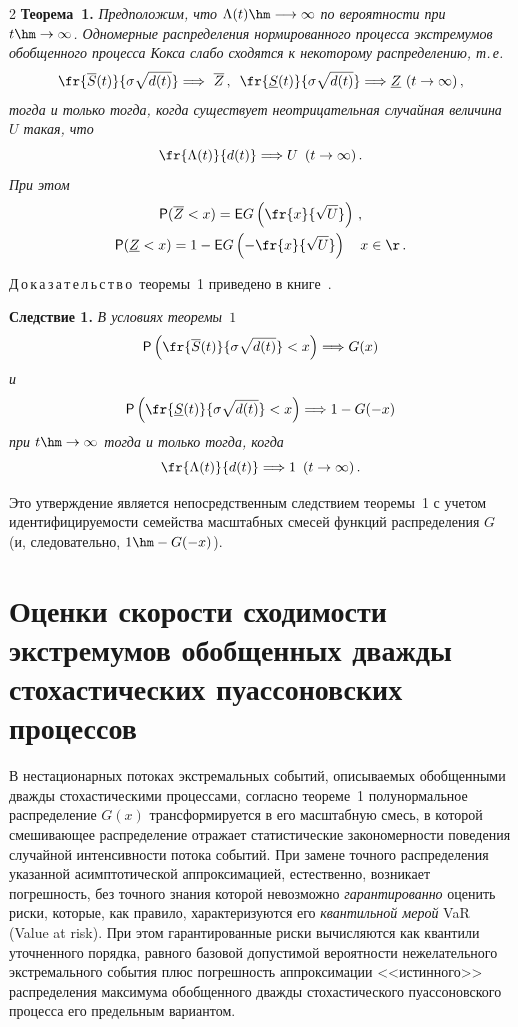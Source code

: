 \begin{multicols}{2}
\noindent
\textbf{Теорема~1.} \textit{Предположим, что $\Lambda
(t)\hm\longrightarrow\infty$ по вероятности при $t\hm\to\infty$.
Одномерные распределения нормированного процесса экстремумов
обобщенного процесса Кокса слабо сходятся к некоторому
распределению, т.\,е.}
$$
\fr{\overline S(t)}{\sigma\sqrt{d(t)}} \Longrightarrow\ 
\overline Z\,,\enskip \fr{\underline S(t)}{\sigma\sqrt{d(t)}}
\Longrightarrow  \underline Z \ (t\to\infty)\,,
$$
\textit{тогда и только тогда, когда существует неотрицательная случайная
величина $U$ такая, что}
\begin{equation}
\fr{\Lambda(t)}{d(t)}\Longrightarrow U\enskip
(t\to\infty)\,.
\label{e2-dul}\end{equation}
\textit{При этом}
\begin{gather*}
{\sf P}(\overline Z<x) = {\sf E}G\left(\fr{x}{\sqrt{U}}\right)\,,\\ 
 {\sf
P}(\underline Z<x) =1-{\sf E}G\left(-\fr{x}{\sqrt{U}}\right)\ \ \ x\in\r\,.
\end{gather*}

\smallskip

\noindent
Д\,о\,к\,а\,з\,а\,т\,е\,л\,ь\,с\,т\,в\,о~теоремы~1 приведено в 
книге~\cite{KorolevSokolov2008}.

\smallskip

\noindent
\textbf{Следствие 1.} \textit{В условиях теоремы~$1$
$$
{\sf P}\left(\fr{\overline S(t)}{\sigma \sqrt{d(t)}} <x\right)
\Longrightarrow G(x)
$$ 
и 
$${\sf P}\left(\fr{\underline
S(t)}{\sigma \sqrt{d(t)}} <x\right) \Longrightarrow 1-G(-x)
$$ при
$t\hm\to\infty$ тогда и только тогда, когда}
$$
\fr{\Lambda(t)}{d(t)} \Longrightarrow   1 \enskip (t\to\infty)\,.
$$

\smallskip

Это утверждение является непосредственным следствием теоремы~1 с
учетом идентифици\-ру\-емости семейства масштабных смесей функций
распределения $G$ (и, следовательно, $1\hm-G(-x)$).

\section{Оценки скорости сходимости экстремумов обобщенных дважды стохастических
пуассоновских процессов}

В нестационарных потоках экстремальных событий, описываемых
обобщенными дважды сто\-хастическими процессами, согласно теореме~1
полунор\-мальное распределение $G(x)$ трансформируется в его
масштабную смесь, в которой сме\-ши\-ва\-ющее распределение отражает
статистические закономерности поведения случайной интенсивности
потока событий. При замене точного распределения указанной
асимптотической аппроксимацией, естественно, возникает погрешность,
без точного знания которой невозможно {\it гарантированно} оценить
риски, которые, как правило, характеризуются его {\it квантильной
мерой} VaR (Value at risk). При этом гарантированные риски
вычисляются как квантили уточненного порядка, равного базовой
допустимой вероятности нежелательного экстремального события плюс
погрешность аппроксимации <<истинного>> распределения максимума
обобщенного дважды стохастического пуассоновского процесса его
предельным вариантом.


\end{multicols}

